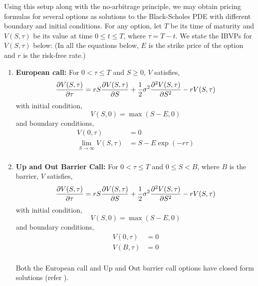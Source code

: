 \documentclass[a4paper,12pt]{article}
\begin{document}
Using this setup along with the no-arbitrage principle, we may obtain pricing formulas for several options as solutions to the Black-Scholes PDE with different boundary and initial conditions. For any option, let $T$ be its time of maturity and $V(S, \tau)$ be its value at time $0 \leq t \leq T$, where $\tau = T - t$. We state the IBVPs for $V(S, \tau)$ below: (In all the equations below, $E$ is the strike price of the option and $r$ is the risk-free rate.)
\begin{enumerate}
    \item \textbf{European call:} For $0 < \tau \leq T$ and $S \geq 0$, $V$ satisfies, 
    \begin{equation}
        \frac{\partial V(S, \tau)}{\partial \tau} = rS\frac{\partial V(S, \tau)}{\partial S} + \frac{1}{2}\sigma^2\frac{\partial^2 V(S, \tau)}{\partial S^2} - rV(S, \tau)
    \end{equation}
    with initial condition,
    \begin{equation*}
        V(S,0) = \max(S - E, 0)
    \end{equation*}
    and boundary conditions,
    \begin{equation*}
        \begin{split}
            V(0, \tau) &= 0\\
            \lim_{S \to \infty} V(S, \tau) &= S - E\exp\left(-r\tau\right)\\
        \end{split}
    \end{equation*}
    
    \item \textbf{Up and Out Barrier Call:} For $0 < \tau \leq T$ and $0 \leq S < B$, where $B$ is the barrier, $V$ satisfies,
    \begin{equation}
        \frac{\partial V(S, \tau)}{\partial \tau} = rS\frac{\partial V(S, \tau)}{\partial S} + \frac{1}{2}\sigma^2\frac{\partial^2 V(S, \tau)}{\partial S^2} - rV(S, \tau)
    \end{equation}
    with initial condition,
    \begin{equation*}
        V(S,0) = \max(S - E, 0)
    \end{equation*}
    and boundary conditions,
    \begin{equation*}
        \begin{split}
            V(0, \tau) &= 0\\
            V(B, \tau) &= 0\\
        \end{split}
    \end{equation*}
    
    Both the European call and Up and Out barrier call options have closed form solutions (refer \cite{stoch}).
    

\end{enumerate}
\end{document}
